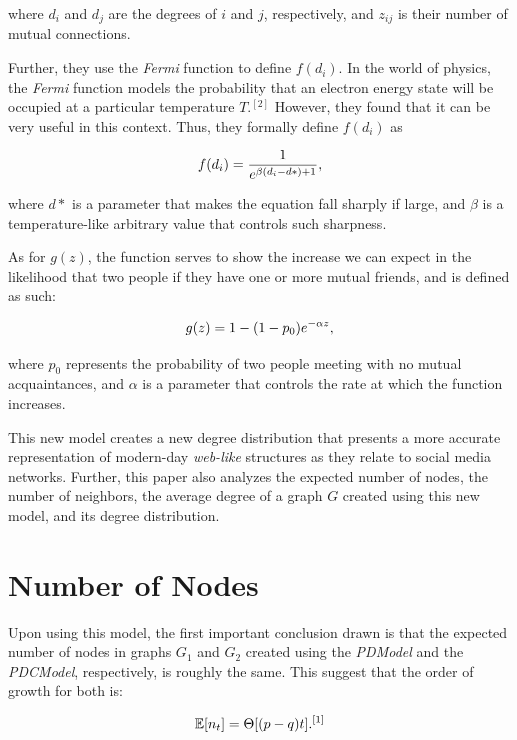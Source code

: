 \documentclass[final,3p,times,twocolumn]{elsarticle}
\begin{document}
where $d_i$ and $d_j$ are the degrees of $i$ and $j$, respectively, and $z_{ij}$ is their number of mutual connections.

Further, they use the \textit{Fermi} function to define $f(d_i)$. In the world of physics, the \textit{Fermi} function models the probability that an electron energy state will be occupied at a particular temperature $T$.$^{[2]}$ However, they found that it can be very useful in this context. Thus, they formally define $f(d_i)$ as 

\begin{equation}
\centering
    f(d_i) = \frac{1}{e^{\beta(d_i - d*) + 1}},
\end{equation}

where $d*$ is a parameter that makes the equation fall sharply if large, and $\beta$ is a temperature-like arbitrary value that controls such sharpness.

As for $g(z)$, the function serves to show the increase we can expect in the likelihood that two people if they have one or more mutual friends, and is defined as such:

\begin{equation}
\centering
    g(z) = 1 - (1 - p_0)e^{-\alpha z},
\end{equation}

where $p_0$ represents the probability of two people meeting with no mutual acquaintances, and $\alpha$ is a parameter that controls the rate at which the function increases.

This new model creates a new degree distribution that presents a more accurate representation of modern-day \textit{web-like} structures as they relate to social media networks. Further, this paper also analyzes the expected number of nodes, the number of neighbors, the average degree of a graph $G$ created using this new model, and its degree distribution.

\section{Number of Nodes}
\label{S:5}

Upon using this model, the first important conclusion drawn is that the expected number of nodes in graphs $G_1$ and $G_2$ created using the \textit{PDModel} and the \textit{PDCModel}, respectively, is roughly the same. This suggest that the order of growth for both is:

\begin{equation}
\centering
    \mathbb{E}[n_t] = \Theta[(p - q)t].^{[1]}
\end{equation}
\end{document}
